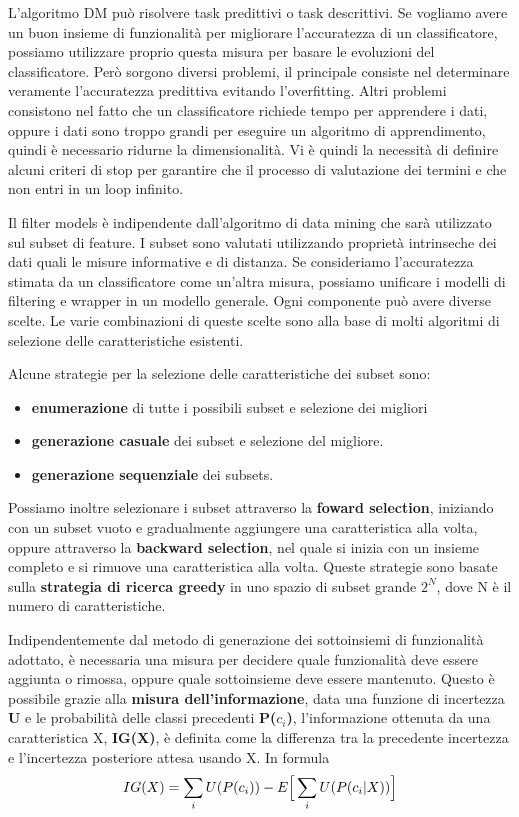 \documentclass[a4paper]{extarticle}
\begin{document}
L'algoritmo DM può risolvere task predittivi o task descrittivi. Se vogliamo avere un buon insieme di funzionalità per migliorare l'accuratezza di un classificatore, possiamo utilizzare proprio questa misura per basare le evoluzioni del classificatore. Però sorgono diversi problemi, il principale consiste nel determinare veramente l'accuratezza predittiva evitando l'overfitting. Altri problemi consistono nel fatto che un classificatore richiede tempo per apprendere i dati, oppure i dati sono troppo grandi per eseguire un algoritmo di apprendimento, quindi è necessario ridurne la dimensionalità. Vi è quindi la necessità di definire alcuni criteri di stop per garantire che il processo di valutazione dei termini e che non entri in un loop infinito.

Il filter models è indipendente dall'algoritmo di data mining che sarà utilizzato sul subset di feature. I subset sono valutati utilizzando proprietà intrinseche dei dati quali le misure informative e di distanza. Se consideriamo l'accuratezza stimata da un classificatore come un'altra misura, possiamo unificare i modelli di filtering e wrapper in un modello generale. Ogni componente può avere diverse scelte. Le varie combinazioni di queste scelte sono alla base di molti algoritmi di selezione delle caratteristiche esistenti.

Alcune strategie per la selezione delle caratteristiche dei subset sono:
\begin{itemize}
\item \textbf{enumerazione} di tutte i possibili subset e selezione dei migliori
\item \textbf{generazione casuale} dei subset e selezione del migliore.
\item \textbf{generazione sequenziale} dei subsets.
\end{itemize}

Possiamo inoltre selezionare i subset attraverso la \textbf{foward selection}, iniziando con un subset vuoto e gradualmente aggiungere una caratteristica alla volta, oppure attraverso la \textbf{backward selection}, nel quale si inizia con un insieme completo e si rimuove una caratteristica alla volta. Queste strategie sono basate sulla \textbf{strategia di ricerca greedy} in uno spazio di subset grande $2^N$, dove N è il numero di caratteristiche.

Indipendentemente dal metodo di generazione dei sottoinsiemi di funzionalità adottato, è necessaria una misura per decidere quale funzionalità deve essere aggiunta o rimossa, oppure quale sottoinsieme deve essere mantenuto. Questo è possibile grazie alla \textbf{misura dell'informazione}, data una funzione di incertezza \textbf{U} e le probabilità delle classi precedenti \textbf{P($c_i$)}, l'informazione ottenuta da una caratteristica X, \textbf{IG(X)}, è definita come la differenza tra la precedente incertezza e l'incertezza posteriore attesa usando X. In formula
\begin{equation*}
IG(X)= \sum_{i} U(P(c_i))-E\Bigr[\sum_{i}U(P(c_i|X))\Bigl]
\end{equation*}
\end{document}
